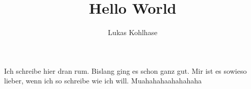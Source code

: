 \documentclass{article}
\author{Lukas Kohlhase}
\title{Hello World}
\begin{document}
Ich schreibe hier dran rum. Bislang ging es schon ganz gut. Mir ist es sowieso lieber, wenn ich so schreibe wie ich will. Muahahahaahahahaha 
\end{document}
